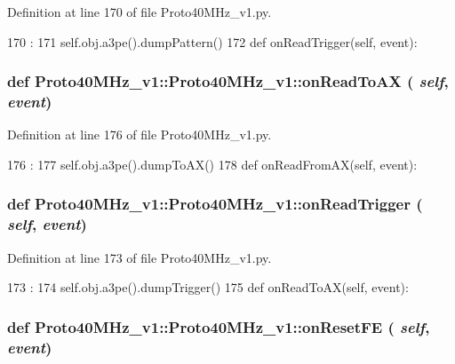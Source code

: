 Definition at line 170 of file Proto40MHz\_\-v1.py.


\begin{DoxyCode}
170                                   :
171         self.obj.a3pe().dumpPattern()
172 
    def onReadTrigger(self, event):
\end{DoxyCode}
\hypertarget{classProto40MHz__v1_1_1Proto40MHz__v1_a07a2d5cfd891aa90a4644fdd57733fda}{
\subsubsection[{onReadToAX}]{\setlength{\rightskip}{0pt plus 5cm}def Proto40MHz\_\-v1::Proto40MHz\_\-v1::onReadToAX ( {\em self}, \/   {\em event})}}
\label{classProto40MHz__v1_1_1Proto40MHz__v1_a07a2d5cfd891aa90a4644fdd57733fda}


Definition at line 176 of file Proto40MHz\_\-v1.py.


\begin{DoxyCode}
176                                :
177         self.obj.a3pe().dumpToAX()
178 
    def onReadFromAX(self, event):
\end{DoxyCode}
\hypertarget{classProto40MHz__v1_1_1Proto40MHz__v1_aa5465792296713450c770b2d05da789c}{
\subsubsection[{onReadTrigger}]{\setlength{\rightskip}{0pt plus 5cm}def Proto40MHz\_\-v1::Proto40MHz\_\-v1::onReadTrigger ( {\em self}, \/   {\em event})}}
\label{classProto40MHz__v1_1_1Proto40MHz__v1_aa5465792296713450c770b2d05da789c}


Definition at line 173 of file Proto40MHz\_\-v1.py.


\begin{DoxyCode}
173                                   :
174         self.obj.a3pe().dumpTrigger()
175 
    def onReadToAX(self, event):
\end{DoxyCode}
\hypertarget{classProto40MHz__v1_1_1Proto40MHz__v1_a0c83cbf6d566f206f8df615b8f148eb7}{
\subsubsection[{onResetFE}]{\setlength{\rightskip}{0pt plus 5cm}def Proto40MHz\_\-v1::Proto40MHz\_\-v1::onResetFE ( {\em self}, \/   {\em event})}}
\label{classProto40MHz__v1_1_1Proto40MHz__v1_a0c83cbf6d566f206f8df615b8f148eb7}


